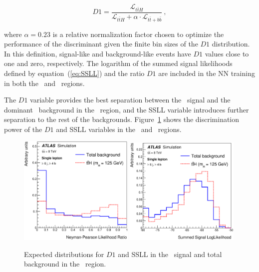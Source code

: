 \begin{equation}
 D1=\frac{\mathcal{L}_{t\bar{t}H}}{{\mathcal{L}_{t\bar{t}H}} + 
 \alpha \cdot \mathcal{L}_{t\bar{t}+b\bar{b}}}\
\label{eq:ME_D1} ,
\end{equation}

\noindent where $\alpha=0.23$ is a relative normalization factor chosen to optimize the
performance of the discriminant given the finite bin sizes of the $D1$ distribution. 
In this definition, 
signal-like and background-like events have $D1$ values close to one and zero, 
respectively.   
The logarithm of the summed signal likelihoods defined by equation~(\ref{eq:SSLL}) 
and the ratio $D1$ are included in the 
NN training in both the \sixthree\ and \sixfour\ regions. 

The $D1$ variable provides the best separation between the
\tth\ signal and the dominant \ttbb\ background in the \sixfour\ region, and the 
SSLL variable introduces further separation to the rest of the backgrounds.  
Figure~\ref{fig:MEM_separation} shows the discrimination power of the $D1$ and SSLL variables in the \sixthree\ and \sixfour\ regions.
\begin{figure}[tb!]
  \centering
  \includegraphics[width=0.49\textwidth]{Analysis/Figures_ttH/ME_D1_6jincl_sep.eps}
  \includegraphics[width=0.49\textwidth]{Analysis/Figures_ttH/ME_SLL_6jincl_sep.eps}
  \caption{Expected distributions for $D1$ and SSLL in the \tth\ signal and total background in the \sixfour\ region.}
  \label{fig:MEM_separation}
\end{figure}

